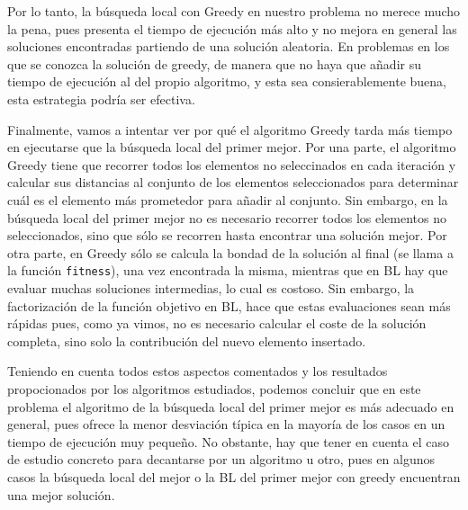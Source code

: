 \documentclass[11pt,a4paper]{article}
\begin{document}
	 Por lo tanto, la búsqueda local con Greedy en nuestro problema no merece mucho la pena, pues presenta el tiempo de ejecución más alto y no mejora en general las soluciones encontradas partiendo de una solución aleatoria. En problemas en los que se conozca la solución de greedy, de manera que no haya que añadir su tiempo de ejecución al del propio algoritmo, y esta sea consierablemente buena, esta estrategia podría ser efectiva. 
	 
	 Finalmente, vamos a intentar ver por qué el algoritmo Greedy tarda más tiempo en ejecutarse que la búsqueda local del primer mejor. Por una parte, el algoritmo Greedy tiene que recorrer todos los elementos no seleccinados en cada iteración y calcular sus distancias al conjunto de los elementos seleccionados para determinar cuál es el elemento más prometedor para añadir al conjunto. Sin embargo, en la búsqueda local del primer mejor no es necesario recorrer todos los elementos no seleccionados, sino que sólo se recorren hasta encontrar una solución mejor. Por otra parte, en Greedy sólo se calcula la bondad de la solución al final (se llama a la función \lstinline|fitness|), una vez encontrada la misma, mientras que en BL hay que evaluar muchas soluciones intermedias, lo cual es costoso. Sin embargo, la factorización de la función objetivo en BL, hace que estas evaluaciones sean más rápidas pues, como ya vimos, no es necesario calcular el coste de la solución completa, sino solo la contribución del nuevo elemento insertado. 
	 
	 Teniendo en cuenta todos estos aspectos comentados y los resultados propocionados por los algoritmos estudiados, podemos concluir que en este problema el algoritmo de la búsqueda local del primer mejor es más adecuado en general, pues ofrece la menor desviación típica en la mayoría de los casos en un tiempo de ejecución muy pequeño. No obstante, hay que tener en cuenta el caso de estudio concreto para decantarse por un algoritmo u otro, pues en algunos casos la búsqueda local del mejor o la BL del primer mejor con greedy encuentran una mejor solución. 
	 
\end{document}
